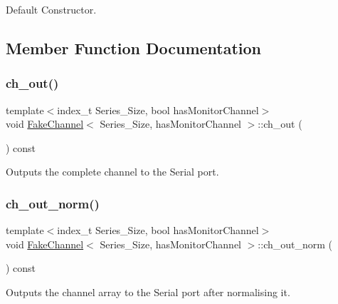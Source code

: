 Default Constructor. 



\subsection{Member Function Documentation}
\mbox{\label{classFakeChannel_a4690f6aaaeded8dd776aab720fdfbd8b}} 
\subsubsection{\texorpdfstring{ch\+\_\+out()}{ch\_out()}}
{\footnotesize\ttfamily template$<$index\+\_\+t Series\+\_\+\+Size, bool has\+Monitor\+Channel$>$ \\
void \hyperlink{classFakeChannel}{Fake\+Channel}$<$ Series\+\_\+\+Size, has\+Monitor\+Channel $>$\+::ch\+\_\+out (\begin{DoxyParamCaption}{ }\end{DoxyParamCaption}) const\hspace{0.3cm}{\ttfamily [inline]}}



Outputs the complete channel to the Serial port. 

\mbox{\label{classFakeChannel_a89dc67c3d19480927f1c07f7a96a1674}} 
\subsubsection{\texorpdfstring{ch\+\_\+out\+\_\+norm()}{ch\_out\_norm()}}
{\footnotesize\ttfamily template$<$index\+\_\+t Series\+\_\+\+Size, bool has\+Monitor\+Channel$>$ \\
void \hyperlink{classFakeChannel}{Fake\+Channel}$<$ Series\+\_\+\+Size, has\+Monitor\+Channel $>$\+::ch\+\_\+out\+\_\+norm (\begin{DoxyParamCaption}{ }\end{DoxyParamCaption}) const\hspace{0.3cm}{\ttfamily [inline]}}



Outputs the channel array to the Serial port after normalising it. 

